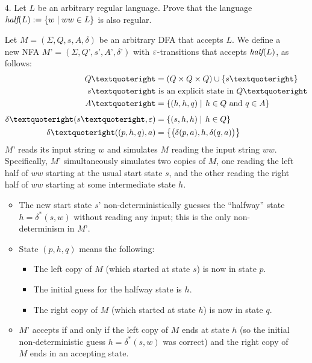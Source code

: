 \documentclass[11pt]{article}
\begin{document}
\begin{enumerate}
\item[4.]  Let $L$ be an arbitrary regular language.  Prove that the language
$\emph{half}(L) := \{ w \mid ww\in L \}$ is also regular.

\begin{solution}
Let $M = (\Sigma, Q, s, A, \delta)$ be an arbitrary DFA that accepts $L$.  We define a new NFA $M’ = (\Sigma, Q’, s’, A’, \delta’)$ with $\varepsilon$-transitions that accepts $\emph{half}(L)$, as follows:
\begin{align*}
	Q’ & = (Q\times Q\times Q) \cup \set{s’} \\
	s’ & \text{~is an explicit state in $Q’$} \\
	A’ &= \Setbar{(h, h, q)}{h\in Q \text{~and~} q\in A}
	\\[1ex]
	\delta’(s’, \e) &= \Setbar{(s, h, h)}{h\in Q} \\
	\delta’((p, h, q), a) &= \Set{\big(\delta(p, a), h, \delta(q, a)\big)}
\end{align*}
$M’$ reads its input string $w$ and simulates $M$ reading the input string $ww$.  Specifically, $M’$ simultaneously simulates two copies of $M$, one reading the left half of $ww$ starting at the usual start state $s$, and the other reading the right half of $ww$ starting at some intermediate state $h$.
\begin{itemize}
\item 
The new start state $s’$ non-deterministically guesses the “halfway” state $h = \delta^*(s, w)$ without reading any input; this is the only non-determinism in $M’$.
\item
State $(p, h, q)$ means the following:
\begin{itemize}
\item The left copy of $M$ (which started at state $s$) is now in state $p$.
\item The initial guess for the halfway state is $h$.
\item The right copy of $M$ (which started at state $h$) is now in state $q$.
\end{itemize}
\item
$M’$ accepts if and only if the left copy of $M$ ends at state $h$ (so the initial non-deterministic guess $h = \delta^*(s, w)$ was correct) and the right copy of $M$ ends in an accepting state.
\end{itemize}
\end{solution}


\end{enumerate}
\end{document}
